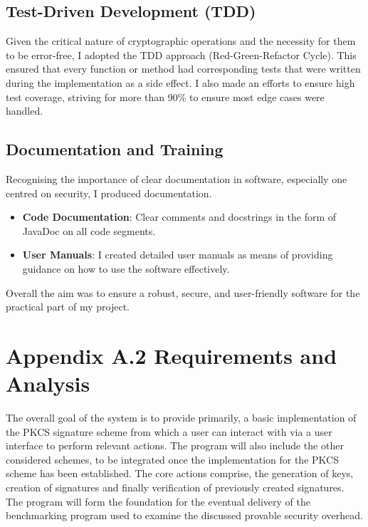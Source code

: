 \documentclass[]{final_report}
\theoremstyle{definition}
\begin{document}
\subsection{Test-Driven Development (TDD)}
Given the critical nature of cryptographic operations and the necessity for them to be error-free, I adopted the TDD approach (Red-Green-Refactor Cycle). This ensured that every function or method had corresponding tests that were written during the implementation as a side effect. I also made an efforts to ensure high test coverage, striving for more than 90\% to ensure most edge cases were handled.

\subsection{Documentation and Training}
Recognising the importance of clear documentation in software, especially one centred on security, I produced documentation.

\begin{itemize}
    \item \textbf{Code Documentation}: Clear comments and docstrings in the form of JavaDoc on all code segments.
    \item \textbf{User Manuals}: I created detailed user manuals as means of providing guidance on how to use the software effectively.
\end{itemize}

Overall the aim was to ensure a robust, secure, and user-friendly software for the practical part of my project.

\section{Appendix A.2 Requirements and Analysis}
The overall goal of the system is to provide primarily, a basic implementation of the PKCS signature scheme from which a user can interact with via a user interface to perform relevant actions. The program will also include the other considered schemes, to be integrated once the implementation for the PKCS scheme has been established.
The core actions comprise, the generation of keys, creation of signatures and finally verification of previously created signatures. 
The program will form the foundation for the eventual delivery of the benchmarking program used to examine the discussed provable security overhead.
\end{document}
